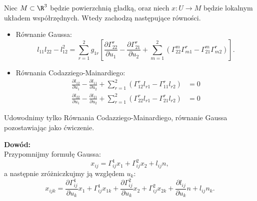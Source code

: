 \begin{frame}[<+->]


\begin{twierdzenie}\label{thm:Gauss-Codazz-Mainard}
Niec $M\subset \R^3$ będzie powierzchnią gładką, oraz niech $x\colon U\to M$ będzie lokalnym układem współrzędnych. Wtedy zachodzą następujące równości.
\begin{itemize}
\item Równanie Gaussa:
\begin{equation*}
l_{11}l_{22}-l_{12}^2=
\sum_{r=1}^{2}g_{1r}
\left[
\frac{\partial \Gamma^r_{22}} {\partial u_{1}}- \frac{\partial\Gamma ^r_{21}}{\partial u_{2}}+
\sum_{m=1}^2 \left(\Gamma^m_{22}\Gamma^r_{m1}-\Gamma^m_{21}\Gamma^r_{m2}\right)\right].
\end{equation*}

\item Równania Codazziego-Mainardiego:
\begin{align*}
\frac{\partial l_{12}}{\partial u_1}-\frac{\partial l_{11}}{\partial u_2} + 
\sum_{r=1}^2 \left( \Gamma^r_{12}l_{r1}-\Gamma^r_{11}l_{r2}\right)&=0\\
\frac{\partial l_{22}}{\partial u_1}-\frac{\partial l_{21}}{\partial u_2} + 
\sum_{r=1}^2 \left( \Gamma^r_{22}l_{r1}-\Gamma^r_{21}l_{r2}\right)&=0
\end{align*}
\end{itemize}
\end{twierdzenie}

\end{frame}
\begin{frame}[<+->]
Udowodnimy tylko Równania Codazziego-Mainardiego, równanie Gaussa pozostawiając jako ćwiczenie.

\pause {}

\pause \textcolor{ared}{\textbf{Dowód: }}\\
Przypomnijmy formułę Gaussa:
\[x_{ij}=\Gamma^1_{ij}x_1+\Gamma^2_{ij}x_2+l_{ij}n,\]\pause
a następnie zróżniczkujmy ją względem $u_k$:
\[x_{ijk}=\frac{\partial \Gamma^1_{ij}}{\partial u_k}x_1+ \Gamma^1_{ij}x_{1k}+ 
\frac{\partial \Gamma^2_{ij}}{\partial u_k}x_2 +\Gamma^2_{ij}x_{2k} 
+\frac{\partial l_{ij}}{\partial u_k}n+l_{ij}n_k.\]

\end{frame}
